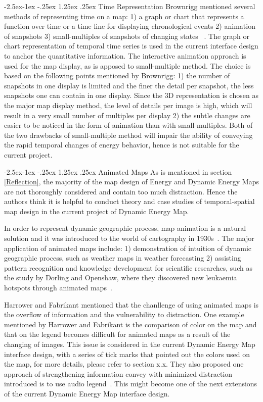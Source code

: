 \documentclass[hidelinks,12pt]{article}
\makeatletter
\renewcommand\paragraph{\@startsection{paragraph}{4}{\z@}%
            {-2.5ex\@plus -1ex \@minus -.25ex}%
            {1.25ex \@plus .25ex}%
            {\normalfont\normalsize\bfseries}}
\makeatother
\begin{document}
\paragraph{Time Representation}
Brownrigg mentioned several methods of representing time on a map: 1)
a graph or chart that represents a function over time or a time line
for displaying chronological events 2) animation of snapshots 3)
small-multiples of snapshots of changing states
~\cite{Brownrigg2005}. The graph or chart representation of temporal
time series is used in the current interface design to anchor the
quantitative information. The interactive animation approach is used
for the map display, as is apposed to small-multiple method. The
choice is based on the following points mentioned by Brownrigg: 1) the
number of snapshots in one display is limited and the finer the detail
per snapshot, the less snapshots one can contain in one display. Since
the 3D representation is chosen as the major map display method, the
level of details per image is high, which will result in a very small
number of multiples per display 2) the subtle changes are easier to be
noticed in the form of animation than with small-multiples. Both of
the two drawbacks of small-multiple method will impair the ability of
conveying the rapid temporal changes of energy behavior, hence is not
suitable for the current project.

\paragraph{Animated Maps}\label{anime}
As is mentioned in section \ref{Reflection}, the majority of the map
design of Energy and Dynamic Energy Maps are not thoroughly considered
and contain too much distraction. Hence the authors think it is
helpful to conduct theory and case studies of temporal-spatial map
design in the current project of Dynamic Energy Map.

In order to represent dynamic geographic process, map animation is a
natural solution and it was introduced to the world of cartography in
1930s~\cite{Harrower2008}. The major application of animated maps
include: 1) demonstration of intuition of dynamic geographic process,
such as weather maps in weather forecasting 2) assisting pattern
recognition and knowledge development for scientific researches, such
as the study by Dorling and Openshaw, where they discovered new
leukaemia hotspots through animated maps~\cite{Dorling1992}.

Harrower and Fabrikant mentioned that the chanllenge of using animated
maps is the overflow of information and the vulnerability to
distraction. One example mentioned by Harrower and Fabrikant is the
comparison of color on the map and that on the legend becomes
difficult for animated maps as a result of the changing of
images. This issue is considered in the current Dynamic Energy Map
interface design, with a series of tick marks that pointed out the
colors used on the map, for more details, please refer to section x.x.
They also proposed one approach of strengthening information convey
with minimized distraction introduced is to use audio
legend~\cite{Harrower2008}. This might become one of the next
extensions of the current Dynamic Energy Map interface design.
\end{document}
